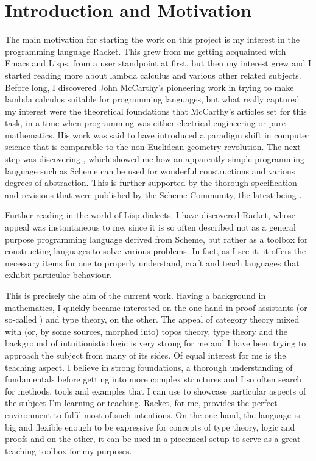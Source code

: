 
\chapter*{Introduction and Motivation}

The main motivation for starting the work on this project is my interest
in the programming language Racket. This grew from me getting acquainted
with Emacs and Lisps, from a user standpoint at first, but then my interest
grew and I started reading more about lambda calculus and various other
related subjects. Before long, I discovered John McCarthy's pioneering
work in trying to make lambda calculus suitable for programming languages,
but what really captured my interest were the theoretical foundations that
McCarthy's articles \cite{mccarthy60, mccarthy61, mccarthy62} set for this
task, in a time when programming was either electrical engineering or
pure mathematics. His work was said to have introduced a paradigm shift
in computer science that is comparable to the non-Euclidean geometry
revolution. The next step was discovering \cite{sicp}, which showed me how
an apparently simple programming language such as Scheme can be used
for wonderful constructions and various degrees of abstraction. This is
further supported by the thorough specification and revisions that were
published by the Scheme Community, the latest being \cite{r7rs}.

Further reading in the world of Lisp dialects, I have discovered Racket,
whose appeal was instantaneous to me, since it is so often described not
as a general purpose programming language derived from Scheme,\footnotemark
but rather as a toolbox for constructing languages to solve various
problems. In fact, as I see it, it offers the necessary items for one to
properly understand, craft and teach languages that exhibit particular
behaviour.


This is precisely the aim of the current work. Having a background in
mathematics, I quickly became interested on the one hand in proof assistants
(or so-called ) and type theory, on the other.
The appeal of category theory mixed with (or, by some sources, morphed into)
topos theory, type theory and the background of intuitionistic logic is
very strong for me and I have been trying to approach the subject from
many of its sides. Of equal interest for me is the teaching aspect.
I believe in strong foundations, a thorough understanding of fundamentals
before getting into more complex structures and I so often search for
methods, tools and examples that I can use to showcase particular aspects
of the subject I'm learning or teaching. Racket, for me, provides the perfect
environment to fulfil most of such intentions. On the one hand, the language
is big and flexible enough to be expressive for concepts of type theory,
logic and proofs and on the other, it can be used in a piecemeal setup
to serve as a great teaching toolbox for my purposes.

